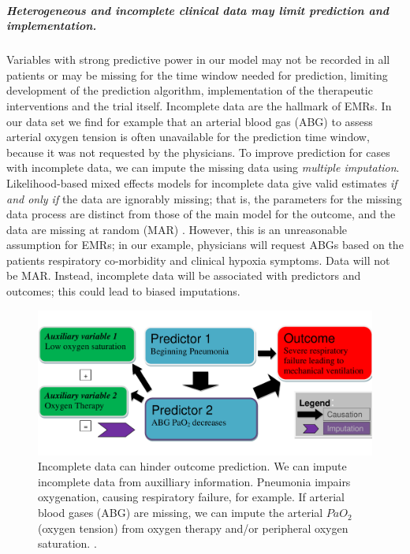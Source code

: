 \documentclass[11pt,notitlepage]{article}
\begin{document}
\subparagraph*{Heterogeneous and incomplete clinical data may limit prediction and implementation.}
Variables with strong predictive power in our model may not be recorded in all patients or may be missing for the time window needed for prediction, limiting development of the prediction algorithm, implementation of the therapeutic interventions and the trial itself. Incomplete data are the hallmark of EMRs. In our data set we find for example that an arterial blood gas (ABG) to assess arterial oxygen tension is often unavailable for the prediction time window, because it was not requested by the physicians. To improve prediction for cases with incomplete data, we can impute the missing data using \textit{multiple imputation}. Likelihood-based mixed effects models for incomplete data give valid estimates \textit{if and only if } the data are ignorably missing; that is, the parameters for the missing data process are distinct from those of the main model for the outcome, and the data are missing at random (MAR) \cite{Rubin_1976}. However, this is an unreasonable assumption for EMRs; in our example, physicians will request ABGs based on the patients respiratory co-morbidity and clinical hypoxia symptoms. Data will not be MAR. Instead, incomplete data will be associated with predictors and outcomes; this could lead to biased imputations.
\begin{figure} 
 \vspace{-10pt}
 \includegraphics[scale=0.4]{Figures/Bayesian_imputation.pdf}
    \vspace{-20pt}
  \caption{\footnotesize Incomplete data can hinder outcome prediction. We can impute incomplete data from auxilliary information. Pneumonia impairs oxygenation, causing respiratory failure, for example. If arterial blood gases (ABG) are missing, we can impute the arterial $PaO_2$ (oxygen tension) from oxygen therapy and/or peripheral oxygen saturation.  \cite{Hall_25389642}.}
   \vspace{-15pt}
    \label{fig:Imputation_fig}
\end{figure}
\end{document}
